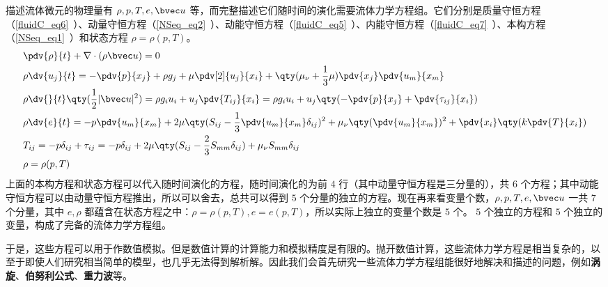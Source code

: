 

描述流体微元的物理量有 $\rho,p,T,e,\bvec u$ 等，而完整描述它们随时间的演化需要流体力学方程组。它们分别是质量守恒方程（\autoref{fluidC_eq6}~）、动量守恒方程（\autoref{NSeq_eq2}~）、动能守恒方程（\autoref{fluidC_eq5}~）、内能守恒方程（\autoref{fluidC_eq7}~）、本构方程（\autoref{NSeq_eq1}~）和状态方程 $\rho=\rho(p,T)$。
\begin{equation}
\begin{aligned}
&\pdv{\rho}{t}+\nabla\cdot(\rho\bvec u)=0\\
&
\rho \dv{u_j}{t}=-\pdv{p}{x_j}+\rho g_j+\mu\pdv[2]{u_j}{x_i} +\qty(\mu_\nu+\frac{1}{3}\mu)\pdv{x_j}\pdv{u_m}{x_m}\\
&\rho \dv{}{t}\qty(\frac{1}{2}|\bvec u|^2)=\rho g_iu_i+u_j\pdv{T_{ij}}{x_i}=\rho g_iu_i+u_j\qty(-\pdv{p}{x_j}+\pdv{\tau_{ij}}{x_i})\\
&\rho \dv{e}{t}=-p\pdv{u_m}{x_m}+2\mu\qty(S_{ij}-\frac{1}{3}\pdv{u_m}{x_m}\delta_{ij})^2+\mu_\nu\qty(\pdv{u_m}{x_m})^2+\pdv{x_i}\qty(k\pdv{T}{x_i})
\\
&T_{ij}=-p\delta_{ij}+\tau_{ij}=-p\delta_{ij}+2\mu \qty(S_{ij}-\frac{2}{3}S_{mm}\delta_{ij})+\mu_\nu S_{mm} \delta_{ij}\\
&\rho=\rho(p,T)
\end{aligned}
\end{equation}
上面的本构方程和状态方程可以代入随时间演化的方程，随时间演化的为前 $4$ 行（其中动量守恒方程是三分量的），共 $6$ 个方程；其中动能守恒方程可以由动量守恒方程推出，所以可以舍去，总共可以得到 $5$ 个分量的独立的方程。现在再来看变量个数，$\rho,p,T,e,\bvec u$ 一共 $7$ 个分量，其中 $e,\rho$ 都蕴含在状态方程之中：$\rho=\rho(p,T),e=e(p,T)$，所以实际上独立的变量个数是 $5$ 个。 $5$ 个独立的方程和 $5$ 个独立的变量，构成了完备的流体力学方程组。

于是，这些方程可以用于作数值模拟。但是数值计算的计算能力和模拟精度是有限的。抛开数值计算，这些流体力学方程是相当复杂的，以至于即使人们研究相当简单的模型，也几乎无法得到解析解。因此我们会首先研究一些流体力学方程组能很好地解决和描述的问题，例如\textbf{涡旋}、\textbf{伯努利公式}、\textbf{重力波}等。